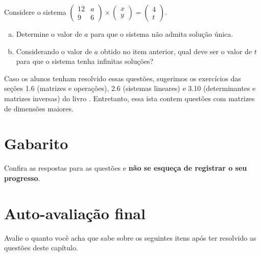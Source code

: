 \documentclass[main.tex]{subfiles}
\begin{document}
\begin{adicional}
Considere o sistema $\begin{pmatrix}12 & a \\ 9 & 6\end{pmatrix} \times \begin{pmatrix}x \\ y\end{pmatrix} = \begin{pmatrix}4 \\ t\end{pmatrix}$.
\begin{enumerate}[a)]
\item Determine o valor de $a$ para que o sistema não admita solução única.
\item Considerando o valor de $a$ obtido no item anterior, qual deve ser o valor de $t$ para que o sistema tenha infinitas soluções?
\end{enumerate}
\end{adicional}

Caso os alunos tenham resolvido essas questões, sugerimos os exercícios das seções 1.6 (matrizes e operações), 2.6 (sistemas lineares) e 3.10 (determinantes e matrizes inversas) do livro . Entretanto, essa ista contem questões com matrizes de dimensões maiores.

\paraAmbos


\newpage

\section{Gabarito}

Confira as respostas para as questões e \textbf{não se esqueça de registrar o seu progresso}.

\imprimeGabarito

\paraAlunos

\section{Auto-avaliação final}
Avalie o quanto você acha que sabe sobre os seguintes itens após ter resolvido as questões deste capítulo.
\end{document}
